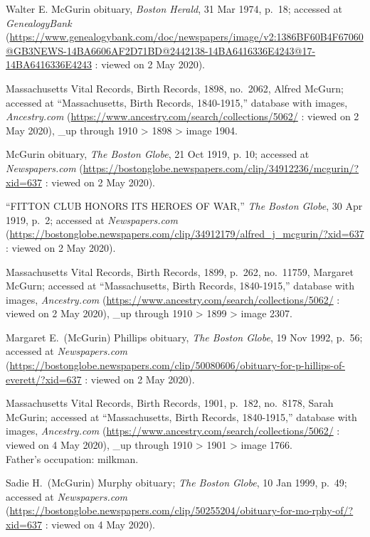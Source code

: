 \begin{thebibliography}{999}
	Walter E. McGurin obituary, \textit{Boston Herald}, 31 Mar 1974, p.\ 18; accessed at \textit{GenealogyBank} (\url{https://www.genealogybank.com/doc/newspapers/image/v2:1386BF60B4F67060@GB3NEWS-14BA6606AF2D71BD@2442138-14BA6416336E4243@17-14BA6416336E4243} : viewed on 2 May 2020).
	
	Massachusetts Vital Records, Birth Records, 1898, no.\ 2062, Alfred McGurn; accessed at ``Massachusetts, Birth Records, 1840-1915,'' database with images, \textit{Ancestry.com} (\url{https://www.ancestry.com/search/collections/5062/} : viewed on 2 May 2020), \_up through 1910 > 1898 > image 1904.
	
	McGurin obituary, \textit{The Boston Globe}, 21 Oct 1919, p. 10; accessed at \textit{Newspapers.com} (\url{https://bostonglobe.newspapers.com/clip/34912236/mcgurin/?xid=637} : viewed on 2 May 2020).	
	
	``FITTON CLUB HONORS ITS HEROES OF WAR,'' \textit{The Boston Globe}, 30 Apr 1919, p.\ 2; accessed at \textit{Newspapers.com} (\url{https://bostonglobe.newspapers.com/clip/34912179/alfred_j_mcgurin/?xid=637} : viewed on 2 May 2020).
	
	Massachusetts Vital Records, Birth Records, 1899, p.\ 262, no.\ 11759, Margaret McGurn; accessed at ``Massachusetts, Birth Records, 1840-1915,'' database with images, \textit{Ancestry.com} (\url{https://www.ancestry.com/search/collections/5062/} : viewed on 2 May 2020), \_up through 1910 > 1899 > image 2307.
	
	Margaret E.\ (McGurin) Phillips obituary, \textit{The Boston Globe}, 19 Nov 1992, p.\ 56; accessed at \textit{Newspapers.com} 
	(\url{https://bostonglobe.newspapers.com/clip/50080606/obituary-for-p-hillips-of-everett/?xid=637} : viewed on 2 May 2020).
	
	Massachusetts Vital Records, Birth Records, 1901, p.\ 182, no.\ 8178, Sarah McGurin; accessed at ``Massachusetts, Birth Records, 1840-1915,'' database with images, \textit{Ancestry.com} (\url{https://www.ancestry.com/search/collections/5062/} : viewed on 4 May 2020), \_up through 1910 > 1901 > image 1766.\\
	Father's occupation: milkman.
	
	Sadie H.\ (McGurin) Murphy obituary; \textit{The Boston Globe}, 10 Jan 1999, p.\ 49; accessed at \textit{Newspapers.com} (\url{https://bostonglobe.newspapers.com/clip/50255204/obituary-for-mo-rphy-of/?xid=637} : viewed on 4 May 2020).
	

\end{thebibliography}
